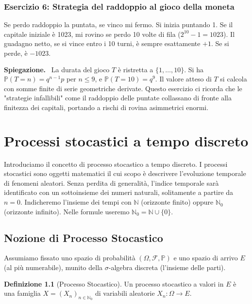 \documentclass[11pt, a4paper]{report}
\theoremstyle{plain}
\theoremstyle{definition}
\newtheorem{definition}[theorem]{Definizione}
\theoremstyle{remark}
\newenvironment{spiegazione}[1][Spiegazione]
{\begin{mdframed}[backgroundcolor=green!5, linecolor=green!50, linewidth=2pt, topline=false, rightline=false, bottomline=false]
\textbf{\textsf{#1.}}\ }
{\end{mdframed}}
\newcommand{\PP}{\mathbb{P}}
\newcommand{\F}{\mathcal{F}}
\newcommand{\N}{\mathbb{N}}
\newcommand{\1}{\mathbf{1}}
\begin{document}
\subsection*{Esercizio 6: Strategia del raddoppio al gioco della moneta}
Se perdo raddoppio la puntata, se vinco mi fermo. Si inizia puntando 1. Se il capitale iniziale è 1023, mi rovino se perdo 10 volte di fila ($2^{10}-1 = 1023$).
Il guadagno netto, se si vince entro i 10 turni, è sempre esattamente $+1$. Se si perde, è $-1023$.
\begin{spiegazione}
La durata del gioco $T$ è ristretta a $\{1, \dots, 10\}$. Si ha $\PP(T=n) = q^{n-1}p$ per $n \le 9$, e $\PP(T=10) = q^9$.
Il valore atteso di $T$ si calcola con somme finite di serie geometriche derivate.
Questo esercizio ci ricorda che le "strategie infallibili" come il raddoppio delle puntate collassano di fronte alla finitezza dei capitali, portando a rischi di rovina asimmetrici enormi.
\end{spiegazione}



\chapter{Processi stocastici a tempo discreto}

Introduciamo il concetto di processo stocastico a tempo discreto. I processi stocastici sono oggetti matematici il cui scopo è descrivere l'evoluzione temporale di fenomeni aleatori. 
Senza perdita di generalità, l'indice temporale sarà identificato con un sottoinsieme dei numeri naturali, solitamente a partire da $n=0$. Indicheremo l'insieme dei tempi con $\N$ (orizzonte finito) oppure $\N_0$ (orizzonte infinito). Nelle formule useremo $\N_0 = \N \cup \{0\}$.

\section{Nozione di Processo Stocastico}

Assumiamo fissato uno spazio di probabilità $(\Omega, \F, \PP)$ e uno spazio di arrivo $E$ (al più numerabile), munito della $\sigma$-algebra discreta (l'insieme delle parti).

\begin{definition}[Processo Stocastico]
Un processo stocastico a valori in $E$ è una famiglia $X = (X_n)_{n \in \N_0}$ di variabili aleatorie $X_n : \Omega \to E$.
\end{definition}
\end{document}
